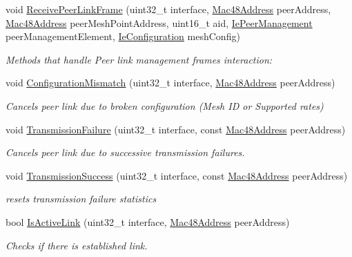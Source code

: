 \begin{DoxyCompactItemize}
\item 
void \hyperlink{classns3_1_1dot11s_1_1PeerManagementProtocol_a04fecd800dd1587dc671735f5c9f2111}{Receive\+Peer\+Link\+Frame} (uint32\+\_\+t interface, \hyperlink{classns3_1_1Mac48Address}{Mac48\+Address} peer\+Address, \hyperlink{classns3_1_1Mac48Address}{Mac48\+Address} peer\+Mesh\+Point\+Address, uint16\+\_\+t aid, \hyperlink{classns3_1_1dot11s_1_1IePeerManagement}{Ie\+Peer\+Management} peer\+Management\+Element, \hyperlink{classns3_1_1dot11s_1_1IeConfiguration}{Ie\+Configuration} mesh\+Config)
\begin{DoxyCompactList}\small\item\em Methods that handle Peer link management frames interaction\+: \end{DoxyCompactList}\item 
void \hyperlink{classns3_1_1dot11s_1_1PeerManagementProtocol_a9c63315d82799e7157f452f5dcd77397}{Configuration\+Mismatch} (uint32\+\_\+t interface, \hyperlink{classns3_1_1Mac48Address}{Mac48\+Address} peer\+Address)
\begin{DoxyCompactList}\small\item\em Cancels peer link due to broken configuration (Mesh ID or Supported rates) \end{DoxyCompactList}\item 
void \hyperlink{classns3_1_1dot11s_1_1PeerManagementProtocol_a2326130b236a064d21d9f481d499aae3}{Transmission\+Failure} (uint32\+\_\+t interface, const \hyperlink{classns3_1_1Mac48Address}{Mac48\+Address} peer\+Address)
\begin{DoxyCompactList}\small\item\em Cancels peer link due to successive transmission failures. \end{DoxyCompactList}\item 
void \hyperlink{classns3_1_1dot11s_1_1PeerManagementProtocol_a3b08552bc0445a91a167f4802fde707a}{Transmission\+Success} (uint32\+\_\+t interface, const \hyperlink{classns3_1_1Mac48Address}{Mac48\+Address} peer\+Address)
\begin{DoxyCompactList}\small\item\em resets transmission failure statistics \end{DoxyCompactList}\item 
bool \hyperlink{classns3_1_1dot11s_1_1PeerManagementProtocol_ab563cf95c14a68e9aa1862c5886aceb2}{Is\+Active\+Link} (uint32\+\_\+t interface, \hyperlink{classns3_1_1Mac48Address}{Mac48\+Address} peer\+Address)
\begin{DoxyCompactList}\small\item\em Checks if there is established link. \end{DoxyCompactList}\end{DoxyCompactItemize}

